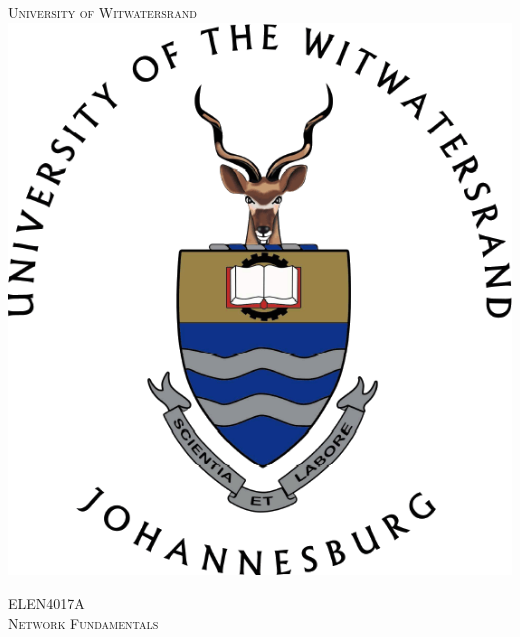 \documentclass[10pt, conference]{IEEEtran}
\begin{document}
\begin{titlepage}
\newcommand{\HRule}{\rule{\linewidth}{0.5mm}} %

\center %
 

\textsc{\LARGE University of Witwatersrand}\\[1.5cm] %

\includegraphics[scale=0.25]{Wits.png}%
 
 
\textsc{\Large ELEN4017A}\\[0.5cm] %
\textsc{\large Network Fundamentals}\\[0.5cm] %




\end{titlepage}
\end{document}

